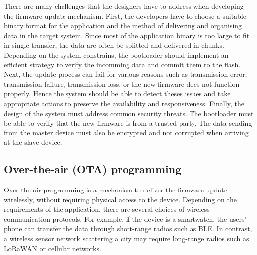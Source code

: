 \justify
There are many challenges that the designers have to address when developing 
the firmware update mechanism. First, the developers have to choose a suitable
binary format for the application and the method of delivering and organising
data in the target system. Since most of the application binary is too large 
to fit in single transfer, the data are often be splitted and delivered in chunks.
Depending on the system constrains, the bootloader should implement an efficient 
strategy to verify the incomming data and commit them to the flash. Next, the
update process can fail for various reasons such as transmission error, 
transmission failure, transmission loss, or the new firmware does not function
properly. Hence the system should be able to detect theses issues and take 
appropriate actions to preserve the availability and responsiveness. Finally,
the design of the system must address common security threats. The bootloader 
must be able to verify that the new firmware is from a trusted party. The data
sending from the master device must also be encrypted and not corrupted when 
arriving at the slave device. 


\subsection{Over-the-air (OTA) programming}
\justify
Over-the-air programming is a mechanism to deliver the firmware update wirelessly, 
without requiring physical access to the device. Depending on the requirements 
of the application, there are several choices of wireless communication protocols. 
For example, if the device is a smartwatch, the users' phone can transfer the data 
through short-range radios such as BLE. In contrast, a wireless sensor network 
scattering a city may require long-range radios such as LoRaWAN or cellular 
networks.  



% 